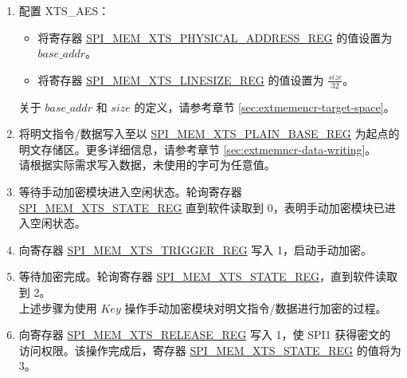 \documentclass[main\_\_CN.tex]{subfiles}
\begin{document}
\begin{enumerate}
    
    \item 配置 XTS\_AES： 
    \begin{itemize}
        \item 将寄存器 \hyperref[regdesc:SPIMEMXTSPHYSICALADDRESSREG]{SPI\_MEM\_XTS\_PHYSICAL\_ADDRESS\_REG} 的值设置为 \begin{math}base\_addr\end{math}。
        \item 将寄存器 \hyperref[regdesc:SPIMEMXTSLINESIZEREG]{SPI\_MEM\_XTS\_LINESIZE\_REG} 的值设置为 \begin{math}\frac{size}{32}\end{math}。
    \end{itemize}
    关于 \begin{math} base\_addr\end{math} 和 \begin{math}size\end{math} 的定义，请参考章节 \ref{sec:extmemencr-target-space}。
    \item 将明文指令/数据写入至以 \hyperref[regdesc:SPIMEMXTSPLAINBASEREG]{SPI\_MEM\_XTS\_PLAIN\_BASE\_REG} 为起点的明文存储区。更多详细信息，请参考章节 \ref{sec:extmemncr-data-writing}。\\请根据实际需求写入数据，未使用的字可为任意值。
    
    \item 等待手动加密模块进入空闲状态。轮询寄存器 \hyperref[regdesc:SPIMEMXTSSTATEREG]{SPI\_MEM\_XTS\_STATE\_REG} 直到软件读取到 0，表明手动加密模块已进入空闲状态。
    
    \item 向寄存器 \hyperref[regdesc:SPIMEMXTSTRIGGERREG]{SPI\_MEM\_XTS\_TRIGGER\_REG} 写入 1，启动手动加密。
    
    \item 等待加密完成。轮询寄存器 \hyperref[regdesc:SPIMEMXTSSTATEREG]{SPI\_MEM\_XTS\_STATE\_REG}，直到软件读取到 2。\\
    上述步骤为使用 \begin{math}\mathit{Key}\end{math} 操作手动加密模块对明文指令/数据进行加密的过程。
    
    \item 向寄存器 \hyperref[regdesc:SPIMEMXTSRELEASEREG]{SPI\_MEM\_XTS\_RELEASE\_REG} 写入 1，使 SPI1 获得密文的访问权限。该操作完成后，寄存器 \hyperref[regdesc:SPIMEMXTSSTATEREG]{SPI\_MEM\_XTS\_STATE\_REG} 的值将为 3。
    

\end{enumerate}
\end{document}
